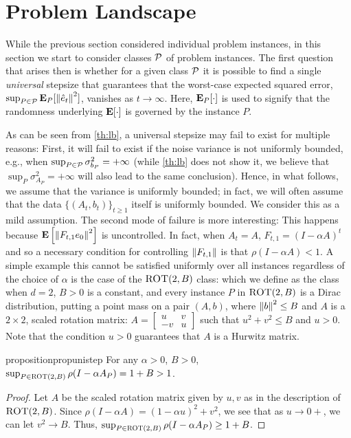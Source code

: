 \section{Problem Landscape}\label{sec:land}
While the previous section considered individual problem instances, in this section we start
to consider classes $\mathcal{P}$ of problem instances.
The first question that arises then is whether for a given class $\mathcal{P}$ it is possible to find a single
\emph{universal} stepsize that guarantees that the worst-case expected squared error,
$\sup_{P\in \mathcal{P}} \mathbf{E}_P[ \left\| \hat{e}_t\right\|^2 ]$, vanishes as $t\to\infty$. Here, $\mathbf{E}_P[\cdot]$ is used to
signify that the randomness underlying $\mathbf{E}[\cdot]$ is governed by the instance $P$.

As can be seen from \cref{th:lb},
a universal stepsize may fail to exist for multiple reasons: 
First, it will fail to exist if the noise variance is not uniformly bounded, e.g.,
when $\sup_{P\in \mathcal{P}} \sigma^2_{b_P}=+\infty$
(while \cref{th:lb} does not show it, we believe that $\sup_{P} \sigma^2_{A_P}=+\infty$ will also
lead to the same conclusion).
Hence, in what follows, we assume that the variance is uniformly bounded; in fact, we will often
assume that the data $\{(A_t,b_t)\}_{t\ge 1}$ itself is uniformly bounded.
We consider this as a mild assumption.
The second mode of failure is more interesting: This happens because $\mathbf{E}\left[\left\| F_{t,1} e_0\right\|^2\right]$ 
is uncontrolled. In fact, when $A_t = A$, $F_{t,1} = (I-\alpha A)^t$ and so a necessary condition
for controlling $\left\| F_{t,1}\right\|$ is that $\rho(I-\alpha A)<1$.
A simple example this cannot be satisfied uniformly over all instances regardless of the choice of $\alpha$
is the case of  the $\text{\sc ROT}(2,B)$ class: 
which we define as the class when $d=2$, $B>0$ is a constant,
and every instance $P$ in $\text{\sc ROT}(2,B)$ is a Dirac distribution,
putting a point mass on a pair $(A,b)$, where $\left\| b\right\|^2\le B$ 
and $A$ is a $2\times 2$, scaled rotation matrix:
$A=\left[\begin{matrix} u &v \\ -v & u\end{matrix}\right]$ such that $u^2+v^2\leq B$ and $u>0$.
Note that the condition $u>0$ guarantees that $A$ is a Hurwitz matrix.
\begin{restatable}{proposition}{propunistep}\label{prop:unistep}
For any $\alpha>0$, $B>0$, $\sup_{P\in \text{\sc ROT}(2,B)}  \rho(I-\alpha A_P) =1+ B> 1$.
\end{restatable}
\begin{proof}
Let $A$ be the scaled rotation matrix given by $u,v$ as in the description of $\text{\sc ROT}(2,B)$.
Since $\rho(I-\alpha A)=(1-\alpha u)^2+v^2$, we see that as $u\to 0+$, we can let $v^2 \to B$.
Thus, $\sup_{P\in \text{\sc ROT}(2,B)}  \rho(I-\alpha A_P) \ge 1+B$.
\end{proof}
